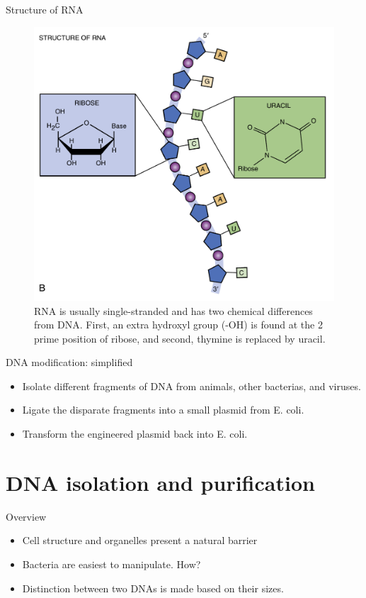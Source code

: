 \documentclass[ignorenonframetext,aspectratio=169]{beamer}
\providecommand{\tightlist}{%
  \setlength{\itemsep}{0pt}\setlength{\parskip}{0pt}}
\begin{document}
\begin{frame}{Structure of RNA}
\protect\hypertarget{structure-of-rna}{}

\begin{figure}
\includegraphics[width=0.45\linewidth]{./../images/dna_structure_b} \caption{RNA is usually single-stranded and has two chemical differences from DNA. First, an extra hydroxyl group (-OH) is found at the 2 prime position of ribose, and second, thymine is replaced by uracil.}\label{fig:nucleic-acid-rna}
\end{figure}

\end{frame}

\begin{frame}{DNA modification: simplified}
\protect\hypertarget{dna-modification-simplified}{}

\begin{itemize}
\tightlist
\item
  Isolate different fragments of DNA from animals, other bacterias, and
  viruses.
\item
  Ligate the disparate fragments into a small plasmid from E. coli.
\item
  Transform the engineered plasmid back into E. coli.
\end{itemize}

\end{frame}

\hypertarget{dna-isolation-and-purification}{%
\section{DNA isolation and
purification}\label{dna-isolation-and-purification}}

\begin{frame}{Overview}
\protect\hypertarget{overview}{}

\begin{itemize}
\tightlist
\item
  Cell structure and organelles present a natural barrier
\item
  Bacteria are easiest to manipulate. How?
\item
  Distinction between two DNAs is made based on their sizes.
\end{itemize}

\end{frame}
\end{document}
